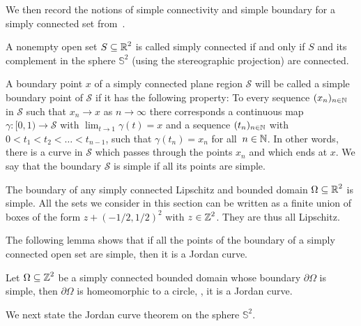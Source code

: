\documentclass[12pt]{amsart}
\numberwithin{equation}{section}
\begin{document}
	We then record the notions of simple connectivity and simple boundary for a simply connected set from~\cite[Definition 14.16]{rudinanalysis}.
	
	\begin{definition}
		A nonempty open set $S \subseteq \operatorname{\mathbb{R}}^2$ is called simply connected if and only if $S$ and its complement in the sphere $\mathbb{S}^2$ (using the stereographic projection) are connected.
	\end{definition}
	
	\begin{definition}
		A boundary point $x$ of a simply connected plane region $\mathcal{S}$
		will be called a simple boundary point of $\mathcal{S}$ if it has the following property: To
		every sequence $(x_n)_{n \in \operatorname{\mathbb{N}}}$ in $\mathcal{S}$ such that $x_n \to x$ as $n \to \infty$ there corresponds a
		continuous map $\gamma : [0, 1) \to \mathcal{S}$ with $\lim_{t \to 1} \gamma (t) = x$ and a sequence $(t_n)_{n \in \operatorname{\mathbb{N}}}$ with $0 < t_1 < t_2 <
		\ldots <  t_{n - 1}$, such that $\gamma(t_n) = x_n$ for all~$n \in \operatorname{\mathbb{N}}$.
		In other words, there is a curve in $\mathcal{S}$ which passes through the points $x_n$
		and which ends at $x$. We say that the boundary $\mathcal{S}$ is simple if all its points are simple.
	\end{definition}
	
	\begin{remark}
		The boundary of any simply connected Lipschitz and bounded domain $\Omega \subseteq \operatorname{\mathbb{R}}^2$ is simple. All the sets we consider in this section can be written as a finite union of boxes of the form $z + (- 1/2 , 1/2)^2$ with $z \in \operatorname{\mathbb{Z}}^2$. They are thus all Lipschitz.
	\end{remark}
	
	The following lemma shows that if all the points of the boundary of a simply connected open set are simple, then it is a Jordan curve. 
	
	
	\begin{lemma}
		Let $\Omega \subseteq \operatorname{\mathbb{Z}}^2$ be a simply connected bounded domain whose boundary $\partial \Omega$ is simple, then $\partial \Omega$ is homeomorphic to a circle, \ie, it is a Jordan curve. 
	\end{lemma} 
	
	We next state the Jordan curve theorem on the sphere $\mathbb{S}^2$.
	
\end{document}

